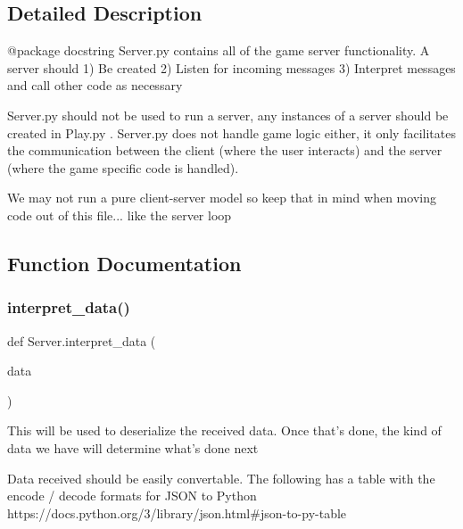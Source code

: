 \subsection{Detailed Description}
\begin{DoxyVerb}@package docstring
Server.py contains all of the game server functionality. A server should
1) Be created
2) Listen for incoming messages
3) Interpret messages and call other code as necessary

Server.py should not be used to run a server, any instances of a server
should be created in Play.py . Server.py does not handle game logic either, it
only facilitates the communication between the client (where the user interacts)
and the server (where the game specific code is handled).

We may not run a pure client-server model so keep that in mind when moving
code out of this file... like the server loop
\end{DoxyVerb}
 

\subsection{Function Documentation}
\mbox{\label{namespace_server_ad1a623c39628e6a85484ed43248ecd8d}} 
\subsubsection{\texorpdfstring{interpret\+\_\+data()}{interpret\_data()}}
{\footnotesize\ttfamily def Server.\+interpret\+\_\+data (\begin{DoxyParamCaption}\item[{}]{data }\end{DoxyParamCaption})}

\begin{DoxyVerb}This will be used to deserialize the received data. Once that's done, the
kind of data we have will determine what's done next
\end{DoxyVerb}
\begin{DoxyVerb}Data received should be easily convertable. The following has a table
with the encode / decode formats for  JSON to Python
https://docs.python.org/3/library/json.html#json-to-py-table
\end{DoxyVerb}
 \mbox{\label{namespace_server_afb89b67e4b9b4c3fe2915449f2a450f6}} 
